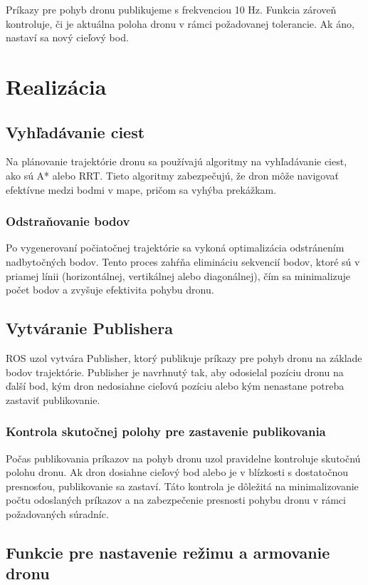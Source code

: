 Príkazy pre pohyb dronu publikujeme s frekvenciou 10 Hz. Funkcia zároveň kontroluje, či je aktuálna poloha dronu v rámci požadovanej tolerancie. Ak áno, nastaví sa nový cieľový bod.

\section{Realizácia}

\subsection{Vyhľadávanie ciest}
Na plánovanie trajektórie dronu sa používajú algoritmy na vyhľadávanie ciest, ako sú A* alebo RRT. Tieto algoritmy zabezpečujú, že dron môže navigovať efektívne medzi bodmi v mape, pričom sa vyhýba prekážkam.

\subsubsection{Odstraňovanie bodov}
Po vygenerovaní počiatočnej trajektórie sa vykoná optimalizácia odstránením nadbytočných bodov. Tento proces zahŕňa elimináciu sekvencií bodov, ktoré sú v priamej línii (horizontálnej, vertikálnej alebo diagonálnej), čím sa minimalizuje počet bodov a zvyšuje efektivita pohybu dronu.

\subsection{Vytváranie Publishera}
ROS uzol vytvára Publisher, ktorý publikuje príkazy pre pohyb dronu na základe bodov trajektórie. Publisher je navrhnutý tak, aby odosielal pozíciu dronu na ďalší bod, kým dron nedosiahne cieľovú pozíciu alebo kým nenastane potreba zastaviť publikovanie.

\subsubsection{Kontrola skutočnej polohy pre zastavenie publikovania}
Počas publikovania príkazov na pohyb dronu uzol pravidelne kontroluje skutočnú polohu dronu. Ak dron dosiahne cieľový bod alebo je v blízkosti s dostatočnou presnosťou, publikovanie sa zastaví. Táto kontrola je dôležitá na minimalizovanie počtu odoslaných príkazov a na zabezpečenie presnosti pohybu dronu v rámci požadovaných súradníc.
\subsection{Funkcie pre nastavenie režimu a armovanie dronu}


